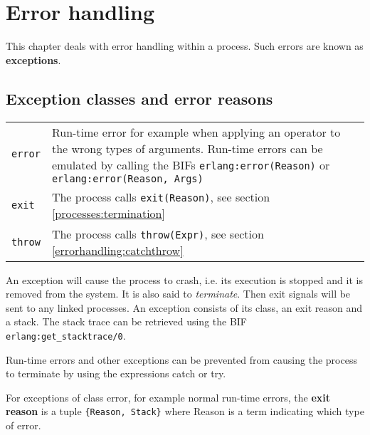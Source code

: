\chapter{Error handling}
\label{errorhandling}

This chapter deals with error handling within a process. Such errors
are known as \textbf{exceptions}.


\section{Exception classes and error reasons}

\begin{center}
\begin{tabular}{|>{\raggedright}p{49pt}|>{\raggedright}p{277pt}|}
\hline
\multicolumn{2}{|p{326pt}|}{Exception classes}\tabularnewline
\hline
\texttt{error} & Run-time error for example when applying an operator to the wrong types of arguments. Run-time errors can be emulated by calling the BIFs \texttt{erlang:error(Reason)} or \texttt{erlang:error(Reason, Args)} \tabularnewline
\hline
\texttt{exit}  & The process calls \texttt{exit(Reason)}, see section \ref{processes:termination}\tabularnewline
\hline
\texttt{throw}  & The process calls \texttt{throw(Expr)}, see section \ref{errorhandling:catchthrow}\tabularnewline
\hline
\end{tabular}
\end{center}

An exception will cause the process to crash, i.e. its execution is
stopped and it is removed from the system. It is also said to
\textit{terminate}. Then exit signals will be sent to any linked
processes.\textit{ }An exception consists of its class, an exit reason
and a stack. The stack trace can be retrieved using the BIF
\texttt{erlang:get\_stacktrace/0}.

Run-time errors and other exceptions can be prevented from causing the
process to terminate by using the expressions catch or try.

For exceptions of class error, for example normal run-time errors, the
\textbf{exit reason} is a tuple \texttt{\{Reason, Stack\}} where
Reason is a term indicating which type of error.

